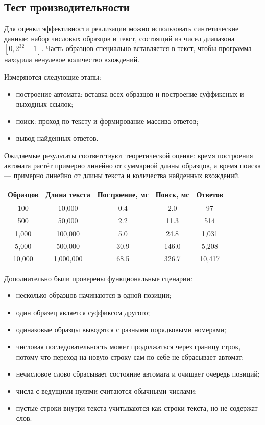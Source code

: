 \documentclass[12pt]{article}
\begin{document}
\subsection*{Тест производительности}
\hspace{2ex}
Для оценки эффективности реализации можно использовать синтетические данные: набор числовых образцов и текст, состоящий из чисел диапазона $[0, 2^{32} - 1]$. Часть образцов специально вставляется в текст, чтобы программа находила ненулевое количество вхождений.

Измеряются следующие этапы:
\begin{itemize}
    \item построение автомата: вставка всех образцов и построение суффиксных и выходных ссылок;
    \item поиск: проход по тексту и формирование массива ответов;
    \item вывод найденных ответов.
\end{itemize}

Ожидаемые результаты соответствуют теоретической оценке: время построения автомата растёт примерно линейно от суммарной длины образцов, а время поиска --- примерно линейно от длины текста и количества найденных вхождений.

\begin{center}
\begin{tabular}{|c|c|c|c|c|}
\hline
\textbf{Образцов} & \textbf{Длина текста} & \textbf{Построение, мс} & \textbf{Поиск, мс} & \textbf{Ответов} \\
\hline
100 & 10,000 & 0.4 & 2.0 & 97 \\
500 & 50,000 & 2.2 & 11.3 & 514 \\
1,000 & 100,000 & 5.0 & 24.8 & 1,031 \\
5,000 & 500,000 & 30.9 & 146.0 & 5,208 \\
10,000 & 1,000,000 & 68.5 & 326.7 & 10,417 \\
\hline
\end{tabular}
\end{center}

Дополнительно были проверены функциональные сценарии:
\begin{itemize}
    \item несколько образцов начинаются в одной позиции;
    \item один образец является суффиксом другого;
    \item одинаковые образцы выводятся с разными порядковыми номерами;
    \item числовая последовательность может продолжаться через границу строк, потому что переход на новую строку сам по себе не сбрасывает автомат;
    \item нечисловое слово сбрасывает состояние автомата и очищает очередь позиций;
    \item числа с ведущими нулями считаются обычными числами;
    \item пустые строки внутри текста учитываются как строки текста, но не содержат слов.
\end{itemize}
\end{document}
